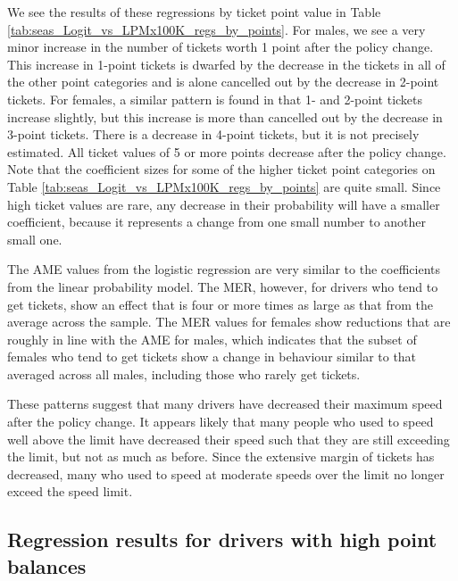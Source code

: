 


We see the results of these regressions by ticket point value in 
Table \ref{tab:seas_Logit_vs_LPMx100K_regs_by_points}. 
For males, we see a very minor increase in the number of tickets 
worth 1 point after the policy change. 
This increase in 1-point tickets is dwarfed by the decrease in the tickets 
in all of the other point categories and is alone cancelled out 
by the decrease in 2-point tickets. 
For females, a similar pattern is found in that 1- and 2-point tickets increase slightly,
but this increase is more than cancelled out by the decrease in 3-point tickets. 
There is a decrease in 4-point tickets, but it is not precisely estimated. 
All ticket values of 5 or more points decrease after the policy change. 
Note that the coefficient sizes for some of the higher ticket point categories on 
Table \ref{tab:seas_Logit_vs_LPMx100K_regs_by_points}
are quite small. Since high ticket values are rare, any decrease in their probability will have a smaller coefficient, 
because it represents a change from one small number to another small one.

The AME values from the logistic regression are very similar to
the coefficients from the linear probability model. 
The MER, however, for drivers who tend to get tickets, 
show an effect that is four or more times as large 
as that from the average across the sample. 
The MER values for females show reductions 
that are roughly in line with the AME for males, 
which indicates that the subset of females who tend to get tickets
show a change in behaviour similar to that 
averaged across all males, including those who rarely get tickets. 


These patterns suggest that many drivers have decreased their maximum speed 
after the policy change. 
It appears likely that many people who used to speed well above the limit 
have decreased their speed such that they are still exceeding the limit, 
but not as much as before. 
Since the extensive margin of tickets has decreased, many who used to speed at moderate speeds over the limit 
no longer exceed the speed limit.


\subsection{Regression results for drivers with high point balances}
\label{sec:Empirical_high_pts}

